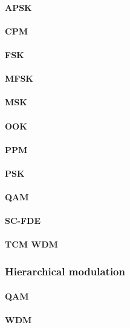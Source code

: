 \paragraph{APSK} 
\paragraph{CPM} 
\paragraph{FSK} 
\paragraph{MFSK} 
\paragraph{MSK} 
\paragraph{OOK} 
\paragraph{PPM} 
\paragraph{PSK} 
\paragraph{QAM} 
\paragraph{SC-FDE} 
\paragraph{TCM WDM}

\subsubsection{Hierarchical modulation}

\paragraph{QAM} 
\paragraph{WDM}

